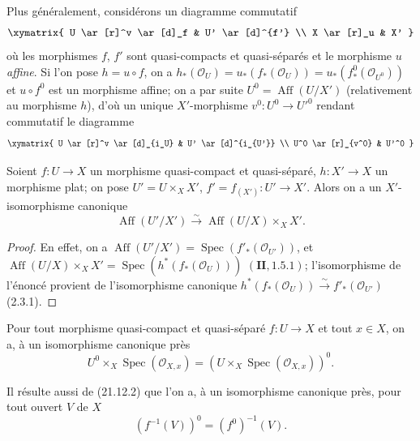 Plus généralement, considérons un diagramme commutatif
\[
  \xymatrix{
    U \ar[r]^v \ar[d]_f & U' \ar[d]^{f'} \\
    X \ar[r]_u & X'
  }
\]
où les morphismes $f$, $f'$ sont quasi-compacts et quasi-séparés et le morphisme $u$
\emph{affine}. Si l'on pose $h=u\circ f$, on a
$h_*(\mathcal O_U)=u_*(f_*(\mathcal O_U))=u_*(f^0_*(\mathcal O_{U^0}))$ et
$u\circ f^0$ est un morphisme affine; on a par suite
$U^0=\operatorname{Aff}(U/X')$ (relativement au morphisme $h$), d'où un unique
$X'$-morphisme $v^0:U^0\to U'^0$ rendant commutatif le diagramme
\[
  \xymatrix{
    U \ar[r]^v \ar[d]_{i_U} & U' \ar[d]^{i_{U'}} \\
    U^0 \ar[r]_{v^0} & U'^0
  }
\]

\begin{proposition}[21.12.2]
\label{IV.21.12.2}
Soient $f:U\to X$ un morphisme quasi-compact et quasi-séparé,
$h:X'\to X$ un morphisme \textup{plat}; on pose $U'=U\times_X X'$,
$f'=f_{(X')}:U'\to X'$. Alors on a un $X'$-isomorphisme canonique
\[
\label{IV.21.12.2.1}
  \operatorname{Aff}(U'/X')\xrightarrow{\sim}
  \operatorname{Aff}(U/X)\times_X X'.
  \tag{21.12.2.1}
\]
\end{proposition}

\begin{proof}
En effet, on a
$\operatorname{Aff}(U'/X')=\operatorname{Spec}(f'_*(\mathcal O_{U'}))$, et
$\operatorname{Aff}(U/X)\times_X X'=\operatorname{Spec}(h^*(f_*(\mathcal O_U)))$
$(\mathbf{II}, 1.5.1)$; l'isomorphisme de l'énoncé provient de l'isomorphisme canonique
$h^*(f_*(\mathcal O_U))\xrightarrow{\sim}f'_*(\mathcal O_{U'})$ (2.3.1).
\end{proof}

\begin{corollary}[21.12.3]
\label{IV.21.12.3}
Pour tout morphisme quasi-compact et quasi-séparé $f:U\to X$ et tout $x\in X$, on a,
à un isomorphisme canonique près
\[
  U^0\times_X\operatorname{Spec}(\mathcal O_{X,x})
  =(U\times_X\operatorname{Spec}(\mathcal O_{X,x}))^0.
\]
\end{corollary}

Il résulte aussi de (21.12.2) que l'on a, à un isomorphisme canonique près, pour tout
ouvert $V$ de $X$
\[
\label{IV.21.12.4}
  (f^{-1}(V))^0=(f^0)^{-1}(V).
  \tag{21.12.4}
\]

